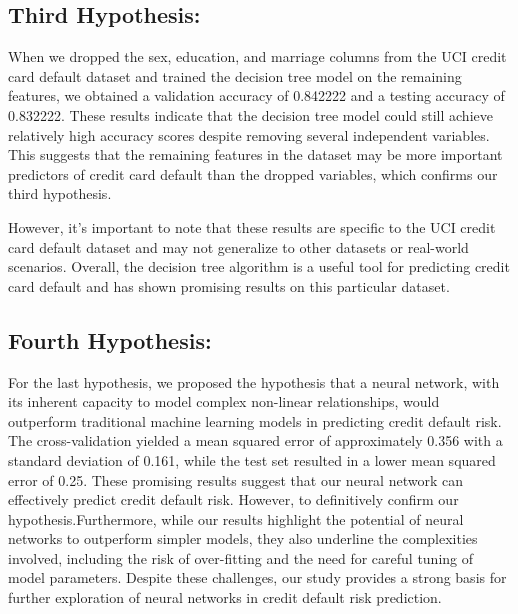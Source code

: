 \documentclass[nohyperref]{article}
\theoremstyle{plain}
\theoremstyle{definition}
\theoremstyle{remark}
\begin{document}
\subsection{Third Hypothesis:}
When we dropped the sex, education, and marriage columns from the UCI credit card default dataset and trained the decision tree model on the remaining features, we obtained a validation accuracy of 0.842222 and a testing accuracy of 0.832222. These results indicate that the decision tree model could still achieve relatively high accuracy scores despite removing several independent variables. This suggests that the remaining features in the dataset may be more important predictors of credit card default than the dropped variables, which confirms our third hypothesis.

However, it's important to note that these results are specific to the UCI credit card default dataset and may not generalize to other datasets or real-world scenarios. Overall, the decision tree algorithm is a useful tool for predicting credit card default and has shown promising results on this particular dataset.

\subsection{Fourth Hypothesis:}
For the last hypothesis, we proposed the hypothesis that a neural network, with its inherent capacity to model complex non-linear relationships, would outperform traditional machine learning models in predicting credit default risk. The cross-validation yielded a mean squared error of approximately 0.356 with a standard deviation of 0.161, while the test set resulted in a lower mean squared error of 0.25. These promising results suggest that our neural network can effectively predict credit default risk. However, to definitively confirm our hypothesis.Furthermore, while our results highlight the potential of neural networks to outperform simpler models, they also underline the complexities involved, including the risk of over-fitting and the need for careful tuning of model parameters. Despite these challenges, our study provides a strong basis for further exploration of neural networks in credit default risk prediction.
\end{document}
